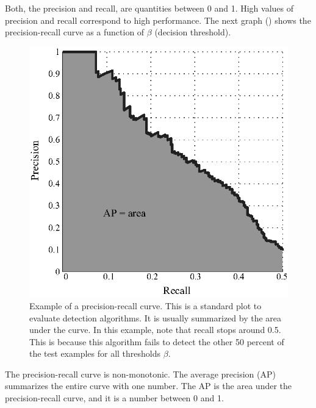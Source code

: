 Both, the precision and recall, are quantities between 0 and 1. High values of precision and recall correspond to high performance. The next graph (\fig{\ref{fig:example_precision_recall}}) shows the precision-recall curve as a function of $\beta$ (decision threshold).


\begin{figure}
\centerline{
\includegraphics[width=.45\linewidth]{figures/object_recognition/example_precision_recall.eps}
}
\caption{Example of a precision-recall curve. This is a standard plot to evaluate detection algorithms. It is usually summarized by the area under the curve. In this example, note that recall stops around 0.5. This is because this algorithm fails to detect the other 50 percent of the test examples for all thresholds $\beta$.}
\label{fig:example_precision_recall}
\end{figure}
The precision-recall curve is non-monotonic. The average precision (AP) summarizes the entire curve with one number. The AP is the area under the precision-recall curve, and it is a number between 0 and 1.





